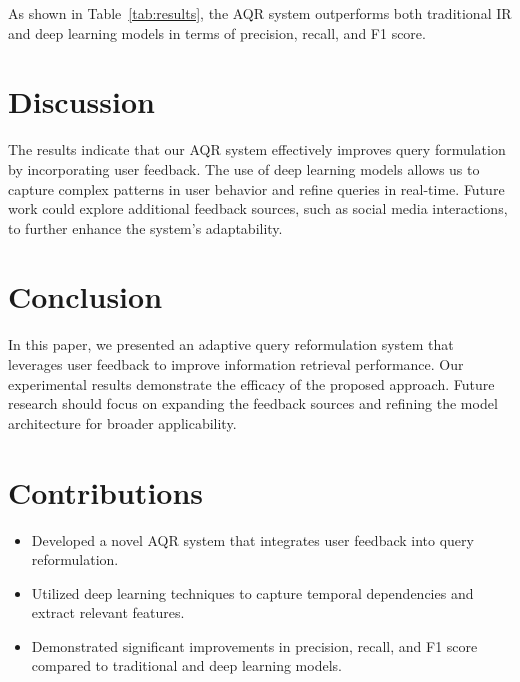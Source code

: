 \documentclass{article}
\begin{document}
As shown in Table~\ref{tab:results}, the AQR system outperforms both traditional IR and deep learning models in terms of precision, recall, and F1 score.

\section{Discussion}
The results indicate that our AQR system effectively improves query formulation by incorporating user feedback. The use of deep learning models allows us to capture complex patterns in user behavior and refine queries in real-time. Future work could explore additional feedback sources, such as social media interactions, to further enhance the system's adaptability.

\section{Conclusion}
In this paper, we presented an adaptive query reformulation system that leverages user feedback to improve information retrieval performance. Our experimental results demonstrate the efficacy of the proposed approach. Future research should focus on expanding the feedback sources and refining the model architecture for broader applicability.

\section{Contributions}
\begin{itemize}
    \item Developed a novel AQR system that integrates user feedback into query reformulation.
    \item Utilized deep learning techniques to capture temporal dependencies and extract relevant features.
    \item Demonstrated significant improvements in precision, recall, and F1 score compared to traditional and deep learning models.
\end{itemize}




\end{document}
